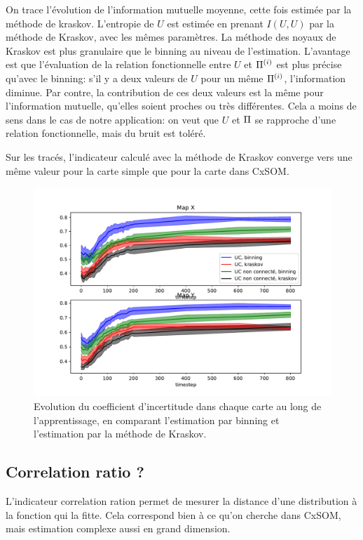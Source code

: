 On trace l'évolution de l'information mutuelle moyenne, cette fois estimée par la méthode de kraskov. L'entropie de $U$ est estimée en prenant $I(U,U)$ par la méthode de Kraskov, avec les mêmes paramètres. 
La méthode des noyaux de Kraskov est plus granulaire que le binning au niveau de l'estimation. L'avantage est que l'évaluation de la relation fonctionnelle entre $U$ et $\Pi^{({i})}$ est plus précise qu'avec le binning: s'il y a deux valeurs de $U$ pour un même $\Pi^{({i})}$, l'information diminue. Par contre, la contribution de ces deux valeurs est la même pour l'information mutuelle, qu'elles soient proches ou très différentes. Cela a moins de sens dans le cas de notre application: on veut que $U$ et $\Pi$ se rapproche d'une relation fonctionnelle, mais du bruit est toléré. 

Sur les tracés, l'indicateur calculé avec la méthode de Kraskov converge vers une même valeur pour la carte simple que pour la carte dans CxSOM. 

\begin{figure}
\includegraphics[width=\textwidth]{evolution_MI}
\caption{Evolution du coefficient d'incertitude dans chaque carte au long de l'apprentissage, en comparant l'estimation par binning et l'estimation par la méthode de Kraskov.}
\label{fig:MI_evol_total}
\end{figure}

\subsection{Correlation ratio ?}

L'indicateur correlation ration permet de mesurer la distance d'une distribution à la fonction qui la fitte. Cela correspond bien à ce qu'on cherche dans CxSOM, mais estimation complexe aussi en grand dimension. 

